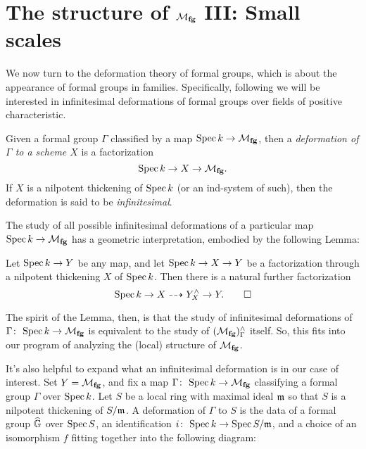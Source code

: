\section{The structure of $\mathcal{M}_{\mathbf{fg}}$ III: Small scales}


We now turn to the deformation theory of formal groups, which is about the appearance of formal groups in families.  Specifically, following  we will be interested in infinitesimal deformations of formal groups over fields of positive characteristic.

\begin{definition}
Given a formal group $\Gamma$ classified by a map $\operatorname{Spec} k \to \mathcal{M}_{\mathbf{fg}}$, then a \textit{deformation of $\Gamma$ to a scheme $X$} is a factorization \[\operatorname{Spec} k \to X \to \mathcal{M}_{\mathbf{fg}}.\]  If $X$ is a nilpotent thickening of $\operatorname{Spec} k$ (or an ind-system of such), then the deformation is said to be \textit{infinitesimal}.
\end{definition}

The study of all possible infinitesimal deformations of a particular map $\operatorname{Spec} k \to \mathcal{M}_{\mathbf{fg}}$ has a geometric interpretation, embodied by the following Lemma:

\begin{lemma}
Let $\operatorname{Spec} k \to Y$ be any map, and let $\operatorname{Spec} k \to X \to Y$ be a factorization through a nilpotent thickening $X$ of $\operatorname{Spec} k$.  Then there is a natural further factorization \[\operatorname{Spec} k \to X \dashrightarrow Y^\wedge_X \to Y. \qed\]
\end{lemma}

\noindent The spirit of the Lemma, then, is that the study of infinitesimal deformations of $\Gamma\colon\thinspace \operatorname{Spec} k \to \mathcal{M}_{\mathbf{fg}}$ is equivalent to the study of $(\mathcal{M}_{\mathbf{fg}})^\wedge_\Gamma$ itself.  So, this fits into our program of analyzing the (local) structure of $\mathcal{M}_{\mathbf{fg}}$.

\begin{example}
It's also helpful to expand what an infinitesimal deformation is in our case of interest.  Set $Y = \mathcal{M}_{\mathbf{fg}}$, and fix a map $\Gamma\colon\thinspace \operatorname{Spec} k \to \mathcal{M}_{\mathbf{fg}}$ classifying a formal group $\Gamma$ over $\operatorname{Spec} k$.  Let $S$ be a local ring with maximal ideal $\mathfrak m$ so that $S$ is a nilpotent thickening of $S / \mathfrak m$.  A deformation of $\Gamma$ to $S$ is the data of a formal group $\widehat{\mathbb G}$ over $\operatorname{Spec} S$, an identification $i\colon\thinspace \operatorname{Spec} k \to \operatorname{Spec} S/\mathfrak m$, and a choice of an isomorphism $f$ fitting together into the following diagram:
\begin{center}
\end{center}
\end{example}

